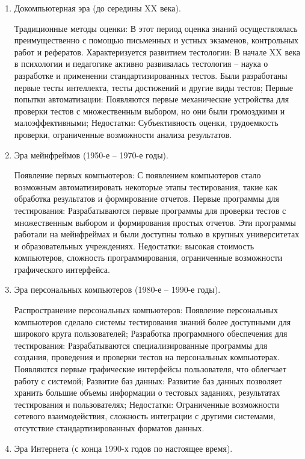 \begin{enumerate}
	\item Докомпьютерная эра (до середины XX века).
	
	Традиционные методы оценки: В этот период оценка знаний осуществлялась преимущественно с помощью письменных и устных экзаменов, контрольных работ и рефератов.
	Характеризуется развитием тестологии: В начале XX века в психологии и педагогике активно развивалась тестология – наука о разработке и применении стандартизированных тестов. Были разработаны первые тесты интеллекта, тесты достижений и другие виды тестов;
	Первые попытки автоматизации: Появляются первые механические устройства для проверки тестов с множественным выбором, но они были громоздкими и малоэффективными;
	Недостатки: Субъективность оценки, трудоемкость проверки, ограниченные возможности анализа результатов.
	
	\item Эра мейнфреймов (1950-е – 1970-е годы).
	
	Появление первых компьютеров: С появлением компьютеров стало возможным автоматизировать некоторые этапы тестирования, такие как обработка результатов и формирование отчетов.
	Первые программы для тестирования: Разрабатываются первые программы для проверки тестов с множественным выбором и формирования простых отчетов. Эти программы работали на мейнфреймах и были доступны только в крупных университетах и образовательных учреждениях.
	Недостатки: высокая стоимость компьютеров, сложность программирования, ограниченные возможности графического интерфейса.
	
	\item Эра персональных компьютеров (1980-е – 1990-е годы).
	
	Распространение персональных компьютеров: Появление персональных компьютеров сделало системы тестирования знаний более доступными для широкого круга пользователей;
	Разработка программного обеспечения для тестирования: Разрабатываются специализированные программы для создания, проведения и проверки тестов на персональных компьютерах. Появляются первые графические интерфейсы пользователя, что облегчает работу с системой;
	Развитие баз данных: Развитие баз данных позволяет хранить большие объемы информации о тестовых заданиях, результатах тестирования и пользователях;
	Недостатки: Ограниченные возможности сетевого взаимодействия, сложность интеграции с другими системами, отсутствие стандартизированных форматов данных.
	

	\item Эра Интернета (с конца 1990-х годов по настоящее время).
	

\end{enumerate}
